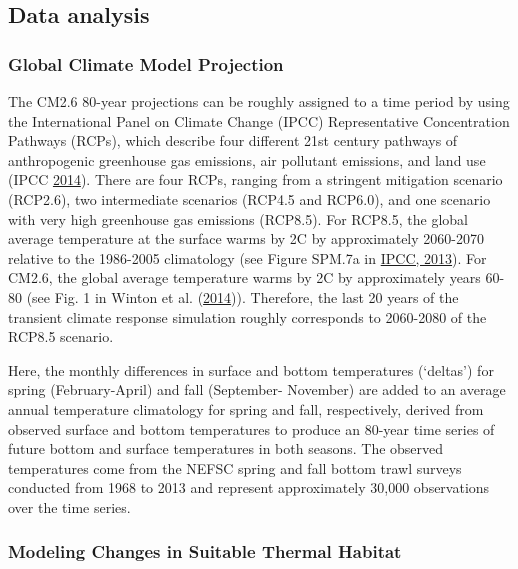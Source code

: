 \documentclass[
]{book}
\begin{document}
\hypertarget{data-analysis-39}{%
\subsection{Data analysis}\label{data-analysis-39}}

\hypertarget{global-climate-model-projection-1}{%
\subsubsection{Global Climate Model Projection}\label{global-climate-model-projection-1}}

The CM2.6 80-year projections can be roughly assigned to a time period by using the International Panel on Climate Change (IPCC) Representative Concentration Pathways (RCPs), which describe four different 21st century pathways of anthropogenic greenhouse gas emissions, air pollutant emissions, and land use (IPCC \protect\hyperlink{ref-IPCC2014}{2014}). There are four RCPs, ranging from a stringent mitigation scenario (RCP2.6), two intermediate scenarios (RCP4.5 and RCP6.0), and one scenario with very high greenhouse gas emissions (RCP8.5). For RCP8.5, the global average temperature at the surface warms by 2C by approximately 2060-2070 relative to the 1986-2005 climatology (see Figure SPM.7a in \href{https://www.ipcc.ch/pdf/assessment-report/ar5/wg1/WG1AR5_SPM_FINAL.pdf}{IPCC, 2013}). For CM2.6, the global average temperature warms by 2C by approximately years 60-80 (see Fig. 1 in Winton et al. (\protect\hyperlink{ref-winton_has_2014}{2014})). Therefore, the last 20 years of the transient climate response simulation roughly corresponds to 2060-2080 of the RCP8.5 scenario.

Here, the monthly differences in surface and bottom temperatures (`deltas') for spring (February-April) and fall (September- November) are added to an average annual temperature climatology for spring and fall, respectively, derived from observed surface and bottom temperatures to produce an 80-year time series of future bottom and surface temperatures in both seasons. The observed temperatures come from the NEFSC spring and fall bottom trawl surveys conducted from 1968 to 2013 and represent approximately 30,000 observations over the time series.

\hypertarget{modeling-changes-in-suitable-thermal-habitat-1}{%
\subsubsection{Modeling Changes in Suitable Thermal Habitat}\label{modeling-changes-in-suitable-thermal-habitat-1}}
\end{document}
